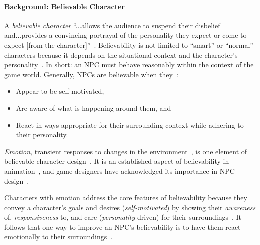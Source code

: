 \paragraph{Background: Believable Character} A \textit{believable character}
``...allows the audience to suspend their disbelief and...provides a convincing
portrayal of the personality they expect or come to expect [from the
character]''~\cite[p.~1]{loyall1997believable}. Believability is not limited to
``smart'' or ``normal'' characters because it depends on the situational
context and the character's personality~\citep{lisetti2015and,
loyall1997believable, reilly1996believable}. In short: an NPC must behave
reasonably within the context of the game world. Generally, NPCs are believable
when they~\citep{lankoski2007gameplay, loyall1997believable,
warpefelt2013analyzing}:
\begin{itemize}
    \item Appear to be self-motivated,

    \item Are aware of what is happening around them, and

    \item React in ways appropriate for their surrounding context while
    adhering to their personality.
\end{itemize}

\textit{Emotion}, transient responses to changes in the
environment~\citep{lazarus1991emotion}, is one element of believable character
design~\citep{de2015beyond, emmerich2018m, gard2000building,
    lankoski2007gameplay, lisetti2015and, loyall1997believable,
    paiva2005learning,
    warpefelt2013analyzing}. It is an established aspect of believability in
animation~\citep{thomas1981illusion}, and game designers have acknowledged its
importance in NPC design~\citep{hudlicka2009foundations, yannakakis2015emotion}.

Characters with emotion address the core features of believability because they
convey a character's goals and desires (\textit{self-motivated}) by showing
their \textit{awareness} of, \textit{responsiveness} to, and care
(\textit{personality}-driven) for their surroundings~\citep{bates1994,
    broekens2021emotion, reilly1996believable}. It follows that one way to
    improve
an NPC's believability is to have them react emotionally to their
surroundings~\citep{togelius2013assessing, yannakakis2015emotion}.
